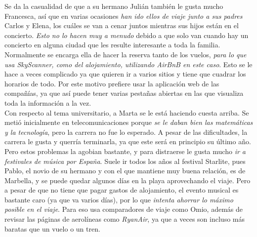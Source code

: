 Se da la casualidad de que a su hermano Julián también le gusta mucho Francesca, así que en varias
ocasiones \textit{han ido ellos de viaje junto a sus padres} Carlos y Elena, los cuáles se van a
cenar juntos mientras sus hijos están en el concierto. \textit{Esto no lo hacen muy a menudo} debido
a que solo van cuando hay un concierto en alguna ciudad que les resulte interesante a toda la familia.
Normalmente se encarga ella de hacer la reserva tanto de los vuelos, \textit{para lo que usa
SkyScanner, como del alojamiento, utilizando AirBnB en este caso}. Esto se le hace a veces complicado
ya que quieren ir a varios sitios y tiene que cuadrar los horarios de todo. Por este motivo prefiere usar la 
aplicación web de las compañías, ya que así puede tener varias pestañas abiertas en las que visualiza toda
la información a la vez. \\

Con respecto al tema universitario, a Marta se le está haciendo cuesta arriba. Se metió inicialmente
en telecomunicaciones porque \textit{se le daban bien las matemáticas y la tecnología}, pero la
carrera no fue lo esperado. A pesar de las dificultades, la carrera le gusta y querría terminarla,
ya que este será en principio su último año. Pero estos problemas la agobian bastante, y para
distraerse le gusta mucho \textit{ir a festivales de música por España}. Suele ir todos los años
al festival Starlite, pues Pablo, el novio de su hermano y con el que mantiene muy buena relación,
es de Marbella, y se puede quedar algunos días en la playa aprovechando el viaje. Pero a pesar de
que no tiene que pagar gastos de alojamiento, el evento musical es bastante caro (ya que va varios
días), por lo que \textit{intenta ahorrar lo máximo posible en el viaje}. Para eso usa comparadores
de viaje como Omio, además de revisar las páginas de aerolíneas como \textit{RyanAir}, ya que a veces son
incluso más baratas que un vuelo o un tren.

